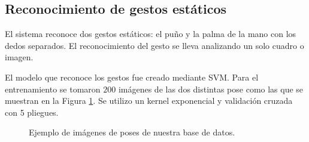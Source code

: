 \subsection{Reconocimiento de gestos estáticos}\label{RecognitionEstatic}

El sistema reconoce dos gestos estáticos: el puño y la palma de la mano con los dedos separados. El reconocimiento del gesto se lleva analizando un solo cuadro o imagen.  

El modelo que reconoce los gestos fue creado mediante SVM. Para el entrenamiento se tomaron $200$ imágenes de las dos distintas pose como las que se muestran en la Figura \ref{fig:SVMTrainingStatic}. Se utilizo un kernel exponencial y validación cruzada con 5 pliegues.   

\begin{figure}[h!]
\begin{center}
      \quad
{}
\end{center}
\caption{Ejemplo de imágenes de poses de nuestra base de datos.}
\label{fig:SVMTrainingStatic}
\end{figure}


